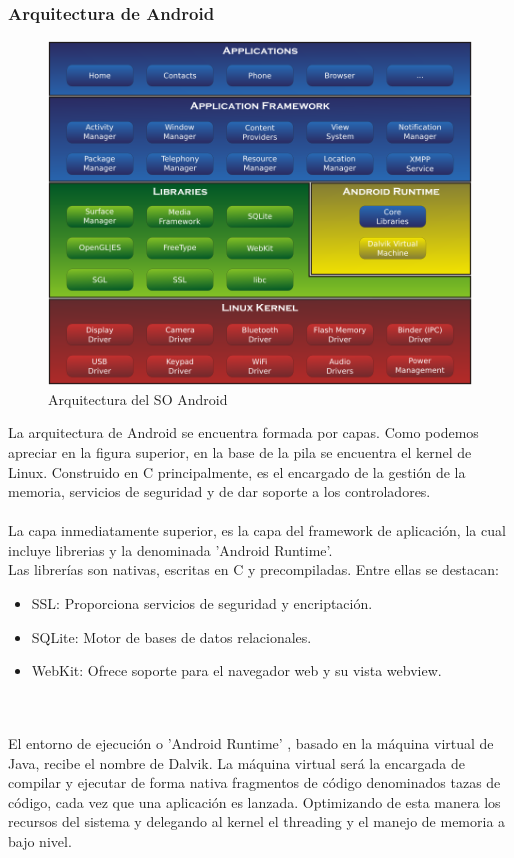 \subsubsection{Arquitectura de Android}

\begin{figure}[H]
	\centering
	\includegraphics[scale=0.7]{imagenes/capasandroid.png}
	\caption{Arquitectura del SO Android}
	\label{Arquitectura del SO Android}
\end{figure}
\noindent
La arquitectura de Android se encuentra formada por capas. Como podemos apreciar en la figura superior, en la base de la pila se encuentra el kernel de Linux. Construido en C principalmente, es el encargado de la gestión de la memoria, servicios de seguridad y de dar soporte a los controladores.
\\
\\
La capa inmediatamente superior, es la capa del framework de aplicación, la cual incluye librerias y la denominada 'Android Runtime'.
\\
Las librerías son nativas, escritas en C y precompiladas. Entre ellas se destacan:
\begin{itemize}
\item SSL: Proporciona servicios de seguridad y encriptación.
\item SQLite: Motor de bases de datos relacionales.
\item WebKit: Ofrece soporte para el navegador web y su vista webview.
\end{itemize}
\\
\\
El entorno de ejecución o 'Android Runtime' , basado en la máquina virtual de Java, recibe el nombre de Dalvik. La máquina virtual será la encargada de compilar y ejecutar de forma nativa fragmentos de código denominados tazas de código, cada vez que una aplicación es lanzada. Optimizando de esta manera los recursos del sistema y delegando al kernel el threading y el manejo de memoria a bajo nivel.

